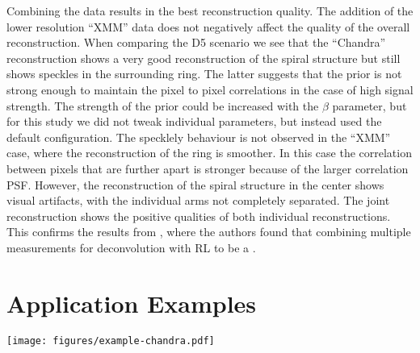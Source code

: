 \documentclass[twocolumn]{aastex631}
\newcommand{\chandra}{\textit{Chandra}~}
\newcommand{\jolideco}{\textit{Jolideco}~}
\newcommand{\dvd}[1]{{\color{red} [DvD: #1]}}
\begin{document}
    Combining the data results in the best reconstruction quality. The addition of the lower resolution \enquote{XMM} data does not negatively affect the quality of the overall reconstruction. When comparing the D5 scenario we see that the \enquote{Chandra} reconstruction shows a very good reconstruction of the spiral structure but still shows speckles in the surrounding ring. The latter suggests that the prior is not strong enough to maintain the pixel to pixel correlations in the case of high signal strength. The strength of the prior could be increased with the $\beta$ parameter, but for this study we did not tweak individual parameters, but instead used the default configuration. The specklely behaviour is not observed in the \enquote{XMM} case, where the reconstruction of the ring is smoother. In this case the correlation between pixels that are further apart is stronger because of the larger correlation PSF. However, the reconstruction of the spiral structure in the center shows visual artifacts, with the individual arms not completely separated. The joint reconstruction shows the positive qualities of both individual reconstructions. This confirms the results from \cite{Ingaramo2014}, where the authors found that combining multiple measurements for deconvolution with RL to be a .



    \section{Application Examples}
    \begin{figure*}
        \begin{centering}
            \texttt{[image: figures/example-chandra.pdf]}
            \caption{
               \jolideco result \dvd{for}
               \chandra \dvd{observations of} %
               SNR \textit{1E~0102.2–7219}. The \dvd{bottom} left %
               image shows the summed counts from 25 observations. The bottom right image  shows the %
               the \jolideco deconvolution. %
               The flux is given as counts relative to \dvd{obsID}
               1308. The panels \textit{Zoom A}, \textit{Zoom B} and \textit{Zoom C} show a zoomed-in version of three example regions in the SNR, marked with the white rectangles in the large images. The colormap and scale used in the zoom insets is the same as used for the larger images.
            }
            \label{fig:example-chandra}
        \end{centering}
    \end{figure*}
\end{document}
